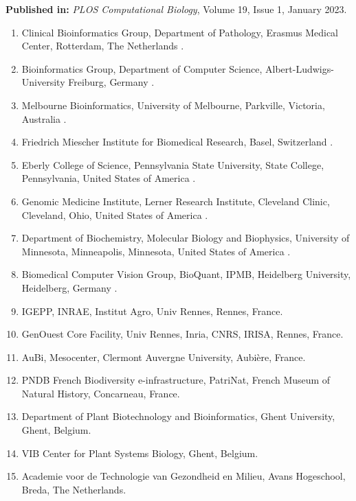 \textbf{Published in:} \emph{PLOS Computational Biology}, Volume 19, Issue 1, January 2023.\\

\small

\begin{enumerate}
\itemsep-0.5em
\item Clinical Bioinformatics Group, Department of Pathology, Erasmus Medical Center, Rotterdam, The Netherlands .\label{gtn-affil:1}
\item Bioinformatics Group, Department of Computer Science, Albert-Ludwigs-University Freiburg, Germany .\label{gtn-affil:2}
\item Melbourne Bioinformatics, University of Melbourne, Parkville, Victoria, Australia .\label{gtn-affil:3}
\item Friedrich Miescher Institute for Biomedical Research, Basel, Switzerland .\label{gtn-affil:4}
\item Eberly College of Science, Pennsylvania State University, State College, Pennsylvania, United States of America .\label{gtn-affil:5}
\item Genomic Medicine Institute, Lerner Research Institute, Cleveland Clinic, Cleveland, Ohio, United States of America  .\label{gtn-affil:6}
\item Department of Biochemistry, Molecular Biology and Biophysics, University of Minnesota, Minneapolis, Minnesota, United States of America  .\label{gtn-affil:7}
\item Biomedical Computer Vision Group, BioQuant, IPMB, Heidelberg University, Heidelberg, Germany .\label{gtn-affil:8}
\item IGEPP, INRAE, Institut Agro, Univ Rennes, Rennes, France.\label{gtn-affil:9}
\item GenOuest Core Facility, Univ Rennes, Inria, CNRS, IRISA, Rennes, France.\label{gtn-affil:10}
\item AuBi, Mesocenter, Clermont Auvergne University, Aubière, France.\label{gtn-affil:11}
\item PNDB French Biodiversity e-infrastructure, PatriNat, French Museum of Natural History, Concarneau, France.\label{gtn-affil:12}
\item Department of Plant Biotechnology and Bioinformatics, Ghent University, Ghent, Belgium.\label{gtn-affil:13}
\item VIB Center for Plant Systems Biology, Ghent, Belgium.\label{gtn-affil:14}
\item Academie voor de Technologie van Gezondheid en Milieu, Avans Hogeschool, Breda, The Netherlands.\label{gtn-affil:15}

\end{enumerate}
